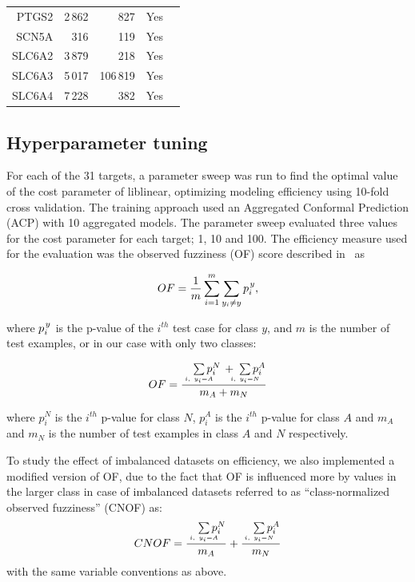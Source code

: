 \documentclass[10pt,article]{memoir}
\newcommand{\inlinetodo}[1]{{\color{magenta}\oldtodo[inline]{\color{white}\textsf{#1}}}}
\begin{document}
\begin{table}
\begin{tabular}{rrrcc}
    PTGS2   &       2\,862  &       827         &   Yes     &       \\
    SCN5A   &       316     &       119         &   Yes     &       \\
    SLC6A2  &       3\,879  &       218         &   Yes     &       \\
    SLC6A3  &       5\,017  &       106\,819    &   Yes     &       \\
    SLC6A4  &       7\,228  &       382         &   Yes     &       \\
\bottomrule
\end{tabular}
\inlinetodo{Extend caption and write Remarks}
\end{table}

\subsection{Hyperparameter tuning}

For each of the 31 targets, a parameter sweep was run to find the optimal value of the
cost parameter of liblinear, optimizing modeling efficiency using 10-fold cross validation. The training
approach used an Aggregated Conformal Prediction (ACP) with 10 aggregated models.
The parameter sweep evaluated three values for the cost parameter for each target; 1, 10 and 100. The
efficiency measure used for the evaluation was the observed fuzziness (OF)
score described in~\cite{Vovk2016} as

\begin{equation}
OF =\frac{ 1}{m} \sum\limits_{i=1}^{m} \sum\limits_{y_i \neq y }  p_i^{\kern1pt y},		
\end{equation}

where $p_i^{\kern1pt y}$ is the p-value of the $i^{th}$ test case for class $y$, and $m$ is the number of test examples, or in our case with only two classes:

\begin{equation}
OF =  \frac
        {\quad\sum\limits_{\mathclap{\substack{\scriptscriptstyle i,\ y_i=A}}}p_i^N \, + \;\sum\limits_{\mathclap{\substack{\scriptscriptstyle i,\ y_i=N}}}p_i^A}
        {m_A + m_N} 
\end{equation}

where $p_i^N$ is the $i^{th}$ p-value for class $N$, $p_i^A$ is the $i^{th}$
p-value for class $A$ and $m_A$ and $m_N$ is the number of test examples in
class $A$ and $N$ respectively.

To study the effect of imbalanced datasets on efficiency, we also implemented a
modified version of OF, due to the fact that OF is influenced more
by values in the larger class in case of imbalanced datasets referred to as
``class-normalized
observed fuzziness'' (CNOF) as:
\begin{equation}
CNOF = \frac
        {\quad\sum\limits_{\mathclap{\substack{\scriptscriptstyle i,\ y_i=A}}}p_i^N}
        {m_A}
       + \frac 
        {\quad\sum\limits_{\mathclap{\substack{\scriptscriptstyle i,\ y_i=N}}}p_i^A}
        {m_N} 
\end{equation}
with the same variable conventions as above.
\end{document}
